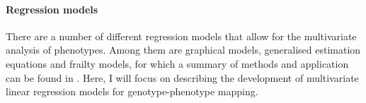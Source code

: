 
\paragraph{Regression models} There are a number of different regression models that allow for the multivariate analysis of phenotypes. Among them are graphical models, generalised estimation equations and frailty models, for which a summary of methods and application can be found in \citep{Shriner2012,Yang2012b}. Here, I will focus on describing the development of multivariate linear regression models for genotype-phenotype mapping. 

